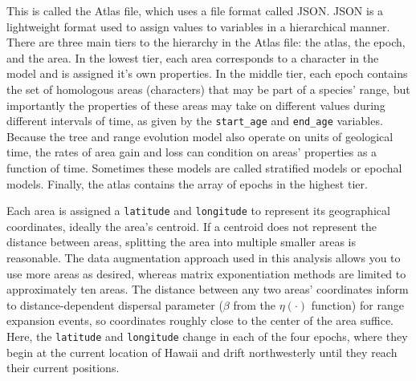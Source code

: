 
This is called the Atlas file, which uses a file format called JSON.
JSON is a lightweight format used to assign values to variables in a hierarchical manner.
There are three main tiers to the hierarchy in the Atlas file: the atlas, the epoch, and the area.
In the lowest tier, each area corresponds to a character in the model and is assigned it's own properties.
In the middle tier, each epoch contains the set of homologous areas (characters) that may be part of a species' range, but importantly the properties of these areas may take on different values during different intervals of time, as given by the {\tt start\_age} and {\tt end\_age} variables.
Because the tree and range evolution model also operate on units of geological time, the rates of area gain and loss can condition on areas' properties as a function of time.
Sometimes these models are called stratified models or epochal models.
Finally, the atlas contains the array of epochs in the highest tier.

Each area is assigned a {\tt latitude} and {\tt longitude} to represent its geographical coordinates, ideally the area's centroid.
If a centroid does not represent the distance between areas, splitting the area into multiple smaller areas is reasonable.
The data augmentation approach used in this analysis allows you to use more areas as desired, whereas matrix exponentiation methods are limited to approximately ten areas.
The distance between any two areas' coordinates inform to distance-dependent dispersal parameter ($\beta$ from the $\eta(\cdot)$ function) for range expansion events, so coordinates roughly close to the center of the area suffice.
Here, the {\tt latitude} and {\tt longitude} change in each of the four epochs, where they begin at the current location of Hawaii and drift northwesterly until they reach their current positions.


